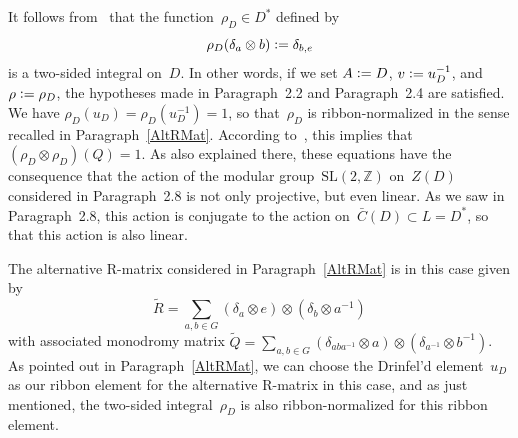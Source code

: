\documentclass[12pt]{article}
\theoremstyle{definition}
\theoremstyle{break}
\newcommand{\Z}{\mathbb{Z}}
\newcommand{\SL}{\mathrm{SL}}
\renewcommand{\1}{\mathbbm{1}}
\newcommand{\ot}{\mathbin{\otimes}}
\newcommand{\deq}{\vcentcolon =}
\begin{document}
It follows from~\cite[Par.~2.3, p.~18]{SZ} that the function~$\rho_D \in D^*$ defined by 
\[\rho_D(\delta_{a} \ot b) \deq \delta_{b,e}\]
is a two-sided integral on~$D$. In other words, if we set $A \deq D$, $v \deq u_D^{-1}$, and $\rho \deq \rho_D$, the hypotheses made in Paragraph~2.2 and Paragraph~2.4 are satisfied. We have $\rho_D(u_D) = \rho_D(u_D^{-1}) = 1$, so that~$\rho_D$ is ribbon-normalized in the sense recalled in Paragraph~\ref{AltRMat}. According to~\cite[Lem.~4.4, p.~39]{SZ}, this implies that
$(\rho_D \ot \rho_D)(Q) = 1$. As also explained there, these equations have the consequence that the action of the modular group~$\SL(2,\Z)$ on~$Z(D)$ considered in Paragraph~2.8 is not only projective, but even linear. As we saw in Paragraph~2.8, this action is conjugate to the action 
on~$\bar{C}(D) \subset L = D^*$, so that this action is also linear. 

The alternative R-matrix considered in Paragraph~\ref{AltRMat} is in this case given by
\[\tilde{R} = \sum_{a,b \in G} (\delta_a \ot e) \ot (\delta_b \ot a^{-1})\]
with associated monodromy matrix
$\tilde{Q} =
\sum_{a, b \in G} (\delta_{aba^{-1}} \ot  a) \ot (\delta_{a^{-1}} \ot  b^{-1})$. As pointed out in Paragraph~\ref{AltRMat}, we can choose the Drinfel'd element~$u_D$ as our ribbon element for the alternative R-matrix in this case, and as just mentioned,
the two-sided integral~$\rho_D$ is also ribbon-normalized for this ribbon element.
\end{document}
